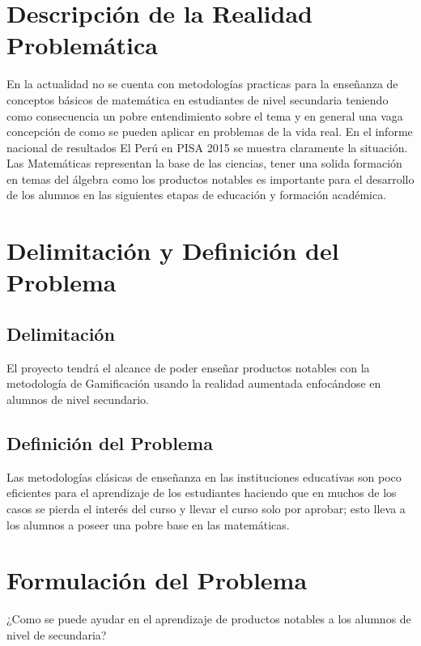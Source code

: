
\section{Descripción de la Realidad Problemática}

En la actualidad no se cuenta con metodologías practicas para la enseñanza de conceptos básicos de  matemática en estudiantes de nivel secundaria teniendo como consecuencia un pobre entendimiento sobre el tema y en general una vaga concepción de como se pueden aplicar en problemas de la vida real. En el informe nacional de resultados El Perú en PISA 2015\cite{Minedu2017} se muestra claramente la situación. Las Matemáticas representan la base de las ciencias, tener una solida formación en temas del álgebra como los productos notables es importante para el desarrollo de los alumnos en las siguientes etapas de educación y formación académica.





\section{Delimitación y Definición del Problema}
    \subsection{Delimitación}
El proyecto tendrá el alcance de poder enseñar productos notables con la metodología de Gamificación usando la realidad aumentada enfocándose en alumnos de nivel secundario.

    \subsection{Definición del Problema}

Las metodologías clásicas de enseñanza en las instituciones educativas son poco eficientes para el aprendizaje de los estudiantes haciendo que en muchos de los casos se pierda el interés del curso y llevar el curso solo por aprobar; esto lleva a los alumnos a poseer una pobre base en las matemáticas.


\section{Formulación del Problema}
¿Como se puede ayudar en el aprendizaje de productos notables a los alumnos de nivel de secundaria?

